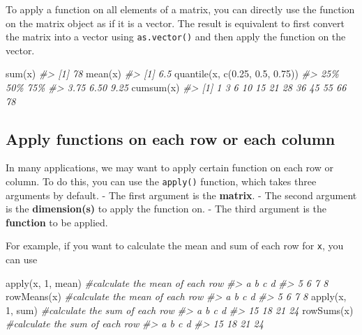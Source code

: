 \documentclass[
]{book}
\newenvironment{Shaded}{\begin{snugshade}}{\end{snugshade}}
\newcommand{\CommentTok}[1]{\textcolor[rgb]{0.56,0.35,0.01}{\textit{#1}}}
\newcommand{\DecValTok}[1]{\textcolor[rgb]{0.00,0.00,0.81}{#1}}
\newcommand{\FloatTok}[1]{\textcolor[rgb]{0.00,0.00,0.81}{#1}}
\newcommand{\FunctionTok}[1]{\textcolor[rgb]{0.00,0.00,0.00}{#1}}
\newcommand{\NormalTok}[1]{#1}
\begin{document}
To apply a function on all elements of a matrix, you can directly use the function on the matrix object as if it is a vector. The result is equivalent to first convert the matrix into a vector using \texttt{as.vector()} and then apply the function on the vector.

\begin{Shaded}
\begin{Highlighting}[]
\FunctionTok{sum}\NormalTok{(x)}
\CommentTok{\#\textgreater{} [1] 78}
\FunctionTok{mean}\NormalTok{(x)}
\CommentTok{\#\textgreater{} [1] 6.5}
\FunctionTok{quantile}\NormalTok{(x, }\FunctionTok{c}\NormalTok{(}\FloatTok{0.25}\NormalTok{, }\FloatTok{0.5}\NormalTok{, }\FloatTok{0.75}\NormalTok{))}
\CommentTok{\#\textgreater{}  25\%  50\%  75\% }
\CommentTok{\#\textgreater{} 3.75 6.50 9.25}
\FunctionTok{cumsum}\NormalTok{(x)}
\CommentTok{\#\textgreater{}  [1]  1  3  6 10 15 21 28 36 45 55 66 78}
\end{Highlighting}
\end{Shaded}

\hypertarget{apply-matrix}{%
\subsection{Apply functions on each row or each column}\label{apply-matrix}}

In many applications, we may want to apply certain function on each row or column. To do this, you can use the \texttt{apply()} function, which takes three arguments by default.
- The first argument is the \textbf{matrix}.
- The second argument is the \textbf{dimension(s)} to apply the function on.
- The third argument is the \textbf{function} to be applied.

For example, if you want to calculate the mean and sum of each row for \texttt{x}, you can use

\begin{Shaded}
\begin{Highlighting}[]
\FunctionTok{apply}\NormalTok{(x, }\DecValTok{1}\NormalTok{, mean)   }\CommentTok{\#calculate the mean of each row}
\CommentTok{\#\textgreater{} a b c d }
\CommentTok{\#\textgreater{} 5 6 7 8}
\FunctionTok{rowMeans}\NormalTok{(x)         }\CommentTok{\#calculate the mean of each row}
\CommentTok{\#\textgreater{} a b c d }
\CommentTok{\#\textgreater{} 5 6 7 8}
\FunctionTok{apply}\NormalTok{(x, }\DecValTok{1}\NormalTok{, sum)    }\CommentTok{\#calculate the sum of each row}
\CommentTok{\#\textgreater{}  a  b  c  d }
\CommentTok{\#\textgreater{} 15 18 21 24}
\FunctionTok{rowSums}\NormalTok{(x)          }\CommentTok{\#calculate the sum of each row }
\CommentTok{\#\textgreater{}  a  b  c  d }
\CommentTok{\#\textgreater{} 15 18 21 24}
\end{Highlighting}
\end{Shaded}
\end{document}
